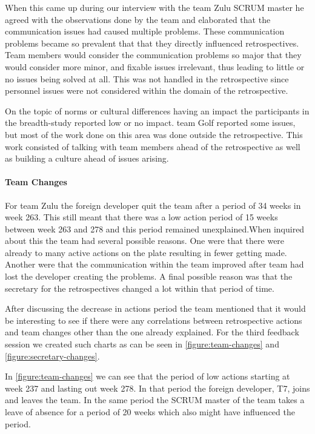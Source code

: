 When this came up during our interview with the team Zulu SCRUM master he agreed with the observations done by the team and elaborated that the communication issues had caused multiple problems.  These communication problems became so prevalent that that they directly influenced retrospectives. Team members would consider the communication problems so major that they would consider more minor, and fixable issues irrelevant, thus leading to little or no issues being solved at all. This was not handled in the retrospective since personnel issues were not considered within the domain of the retrospective.

On the topic of norms or cultural differences having an impact the participants in the breadth-study reported low or no impact. team Golf reported some issues, but most of the work done on this area was done outside the retrospective. This work consisted of talking with team members ahead of the retrospective as well as building a culture ahead of issues arising. 


\paragraph{Team Changes}

For team Zulu the foreign developer quit the team after a period of 34 weeks in week 263. This still meant that there was a low action period of 15 weeks between week 263 and 278 and this period remained unexplained.When inquired about this the team had several possible reasons. One were that there were already to many active actions on the plate resulting in fewer getting made. Another were that the communication within the team improved after team had lost the developer creating the problems. A final possible reason was that the secretary for the retrospectives changed a lot within that period of time. 

After discussing the decrease in actions period the team mentioned that it would be interesting to see if there were any correlations between retrospective actions and team changes other than the one already explained. For the third feedback session we created such charts as can be seen in \autoref{figure:team-changes} and \autoref{figure:secretary-changes}. 

In \autoref{figure:team-changes} we can see that the period of low actions starting at week 237 and lasting out week 278. In that period the foreign developer, T7, joins and leaves the team. In the same period the SCRUM master of the team takes a leave of absence for a period of 20 weeks which also might have influenced the period. 


